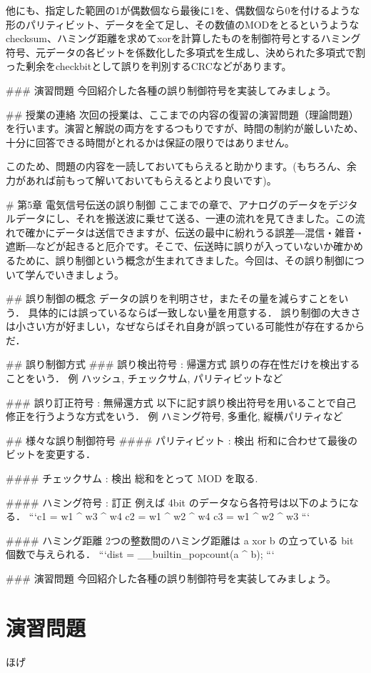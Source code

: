 他にも、指定した範囲の1が偶数個なら最後に1を、偶数個なら0を付けるような形のパリティビット、データを全て足し、その数値のMODをとるというようなchecksum、ハミング距離を求めてxorを計算したものを制御符号とするハミング符号、元データの各ビットを係数化した多項式を生成し、決められた多項式で割った剰余をcheckbitとして誤りを判別するCRCなどがあります。

### 演習問題
今回紹介した各種の誤り制御符号を実装してみましょう。

## 授業の連絡
次回の授業は、ここまでの内容の復習の演習問題（理論問題）を行います。演習と解説の両方をするつもりですが、時間の制約が厳しいため、十分に回答できる時間がとれるかは保証の限りではありません。

このため、問題の内容を一読しておいてもらえると助かります。(もちろん、余力があれば前もって解いておいてもらえるとより良いです)。

# 第5章 電気信号伝送の誤り制御
ここまでの章で、アナログのデータをデジタルデータにし、それを搬送波に乗せて送る、一連の流れを見てきました。この流れで確かにデータは送信できますが、伝送の最中に紛れうる誤差―混信・雑音・遮断―などが起きると厄介です。そこで、伝送時に誤りが入っていないか確かめるために、誤り制御という概念が生まれてきました。今回は、その誤り制御について学んでいきましょう。

## 誤り制御の概念
データの誤りを判明させ，またその量を減らすことをいう．  
具体的には誤っているならば一致しない量を用意する．  
誤り制御の大きさは小さい方が好ましい，なぜならばそれ自身が誤っている可能性が存在するからだ．  

## 誤り制御方式
### 誤り検出符号 : 帰還方式
誤りの存在性だけを検出することをいう．  
例 ハッシュ, チェックサム, パリティビットなど  

### 誤り訂正符号 : 無帰還方式
以下に記す誤り検出符号を用いることで自己修正を行うような方式をいう．  
例 ハミング符号, 多重化, 縦横パリティなど  

## 様々な誤り制御符号
#### パリティビット : 検出
桁和に合わせて最後のビットを変更する．  

#### チェックサム : 検出
総和をとって MOD を取る.

#### ハミング符号 : 訂正
例えば 4bit のデータなら各符号は以下のようになる．  
```c1 = w1 ^ w3 ^ w4  
c2 = w1 ^ w2 ^ w4  
c3 = w1 ^ w2 ^ w3  
```

#### ハミング距離
2つの整数間のハミング距離は a xor b の立っている bit 個数で与えられる．  
```dist = __builtin_popcount(a ^ b);
```

### 演習問題
今回紹介した各種の誤り制御符号を実装してみましょう。



\section{}

\section*{演習問題}
\begin{problems}
\item ほげ
\end{problems}
